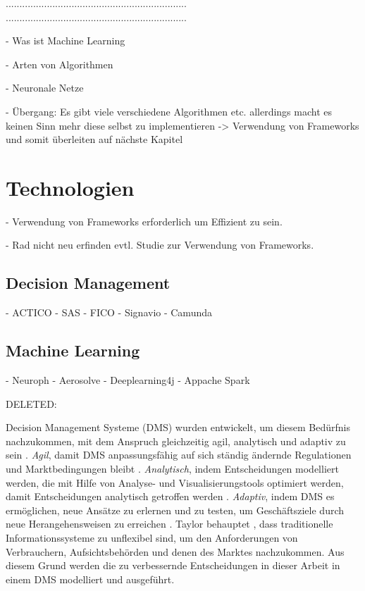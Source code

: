 ..................................................................
..................................................................

- Was ist Machine Learning

- Arten von Algorithmen 

- Neuronale Netze 

- Übergang: Es gibt viele verschiedene Algorithmen etc. allerdings macht es keinen Sinn mehr diese selbst zu implementieren -> Verwendung von Frameworks und somit überleiten auf nächste Kapitel

\section{Technologien}
\label{sec:Technologien2}

- Verwendung von Frameworks erforderlich um Effizient zu sein.

- Rad nicht neu erfinden evtl. Studie zur Verwendung von Frameworks.

\subsection{Decision Management}
\label{subsec:Decision_Management2}

- ACTICO 
- SAS
- FICO 
- Signavio
- Camunda

\subsection{Machine Learning}
\label{subsec:Machine_Learning2}

- Neuroph
- Aerosolve 
- Deeplearning4j
- Appache Spark

DELETED:

Decision Management Systeme (DMS) wurden entwickelt, um diesem Bedürfnis nachzukommen, mit dem Anspruch gleichzeitig agil, analytisch und adaptiv zu sein \cite[vgl. S. 1]{JT12}. \textit{Agil}, damit DMS anpassungsfähig auf sich ständig ändernde Regulationen und Marktbedingungen bleibt \cite[vgl. S. 4]{JT11}. \textit{Analytisch}, indem Entscheidungen modelliert werden, die mit Hilfe von Analyse- und Visualisierungstools optimiert werden, damit Entscheidungen analytisch getroffen werden \cite[vgl. S. 8]{JT11}. \textit{Adaptiv}, indem DMS es ermöglichen, neue Ansätze zu erlernen und zu testen, um Geschäftsziele durch neue Herangehensweisen zu erreichen \cite[vgl. S. 15]{JT11}. Taylor behauptet \cite[vgl. S. 1]{JT12}, dass traditionelle Informationssysteme zu unflexibel sind, um den Anforderungen von Verbrauchern, Aufsichtsbehörden und denen des Marktes nachzukommen. Aus diesem Grund werden die zu verbessernde Entscheidungen in dieser Arbeit in einem DMS modelliert und ausgeführt. 

